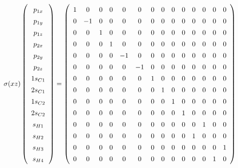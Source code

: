 \documentclass[9pt]{report}
\begin{document}
\normalsize



\scriptsize
\begin{equation}
\sigma(xz)
\renewcommand{\arraystretch}{1.4}
\left(\begin{array}{c} p_{1x}  \\  p_{1y}  \\  p_{1z}  \\  p_{2x}  \\ p_{2y} \\  p_{2z}  \\  1s_{C1}  \\  2s_{C1}  \\  1s_{C2}  \\  2s_{C2}  \\  s_{H1}  \\  s_{H2}  \\  s_{H3}  \\  s_{H4}   \\\end{array}\right)
=
\left(\begin{array}{cccccccccccccc}
1 & 0 & 0 & 0 & 0 & 0 & 0 & 0 & 0 & 0 & 0 & 0 & 0 & 0
\\
0 & -1 & 0 & 0 & 0 & 0 & 0 & 0 & 0 & 0 & 0 & 0 & 0 & 0
\\
0 & 0 & 1 & 0 & 0 & 0 & 0 & 0 & 0 & 0 & 0 & 0 & 0 & 0
\\
0 & 0 & 0 & 1 & 0 & 0 & 0 & 0 & 0 & 0 & 0 & 0 & 0 & 0
\\
0 & 0 & 0 & 0 & -1 & 0 & 0 & 0 & 0 & 0 & 0 & 0 & 0 & 0
\\
0 & 0 & 0 & 0 & 0 & -1 & 0 & 0 & 0 & 0 & 0 & 0 & 0 & 0
\\
0 & 0 & 0 & 0 & 0 & 0 & 1 & 0 & 0 & 0 & 0 & 0 & 0 & 0
\\
0 & 0 & 0 & 0 & 0 & 0 & 0 & 1 & 0 & 0 & 0 & 0 & 0 & 0
\\
0 & 0 & 0 & 0 & 0 & 0 & 0 & 0 & 1 & 0 & 0 & 0 & 0 & 0
\\
0 & 0 & 0 & 0 & 0 & 0 & 0 & 0 & 0 & 1 & 0 & 0 & 0 & 0
\\
0 & 0 & 0 & 0 & 0 & 0 & 0 & 0 & 0 & 0 & 0 & 1 & 0 & 0
\\
0 & 0 & 0 & 0 & 0 & 0 & 0 & 0 & 0 & 0 & 1 & 0 & 0 & 0
\\
0 & 0 & 0 & 0 & 0 & 0 & 0 & 0 & 0 & 0 & 0 & 0 & 0 & 1
\\
0 & 0 & 0 & 0 & 0 & 0 & 0 & 0 & 0 & 0 & 0 & 0 & 1 & 0
\\\end{array}\right)

\end{equation}
\end{document}

